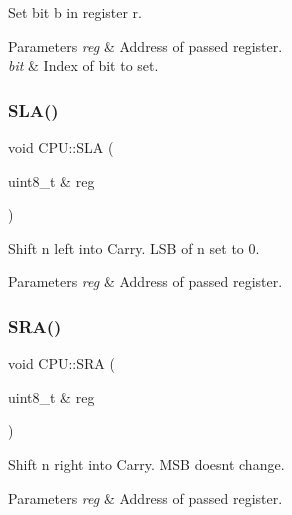 Set bit b in register r. 


\begin{DoxyParams}{Parameters}
{\em reg} & Address of passed register. \\
\hline
{\em bit} & Index of bit to set. \\
\hline
\end{DoxyParams}
\mbox{\label{classCPU_aba8c43d11c2df8a2ff48de9b4165278e}} 
\subsubsection{\texorpdfstring{S\+L\+A()}{SLA()}}
{\footnotesize\ttfamily void C\+P\+U\+::\+S\+LA (\begin{DoxyParamCaption}\item[{uint8\+\_\+t \&}]{reg }\end{DoxyParamCaption})\hspace{0.3cm}{\ttfamily [private]}}



Shift n left into Carry. L\+SB of n set to 0. 


\begin{DoxyParams}{Parameters}
{\em reg} & Address of passed register. \\
\hline
\end{DoxyParams}
\mbox{\label{classCPU_a688b70d418da17a737ed2bbe3818a86b}} 
\subsubsection{\texorpdfstring{S\+R\+A()}{SRA()}}
{\footnotesize\ttfamily void C\+P\+U\+::\+S\+RA (\begin{DoxyParamCaption}\item[{uint8\+\_\+t \&}]{reg }\end{DoxyParamCaption})\hspace{0.3cm}{\ttfamily [private]}}



Shift n right into Carry. M\+SB doesn\textquotesingle{}t change. 


\begin{DoxyParams}{Parameters}
{\em reg} & Address of passed register. \\
\hline
\end{DoxyParams}
\mbox{\label{classCPU_a5e81b5dceebf45a9deb31fa0dbd0f667}} 
